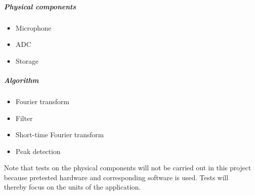 \begin{multicols}{2}
\subparagraph{Physical components}  
\begin{itemize}
	\item Microphone
	\item ADC
	\item Storage
\end{itemize}
\columnbreak
\subparagraph{Algorithm}
\begin{itemize}
	\item Fourier transform
	\item Filter
	\item Short-time Fourier transform
	\item Peak detection
\end{itemize}
\end{multicols}
Note that tests on the physical components will not be carried out in this project because pretested hardware and corresponding software is used. Tests will thereby focus on the units of the application.
 
